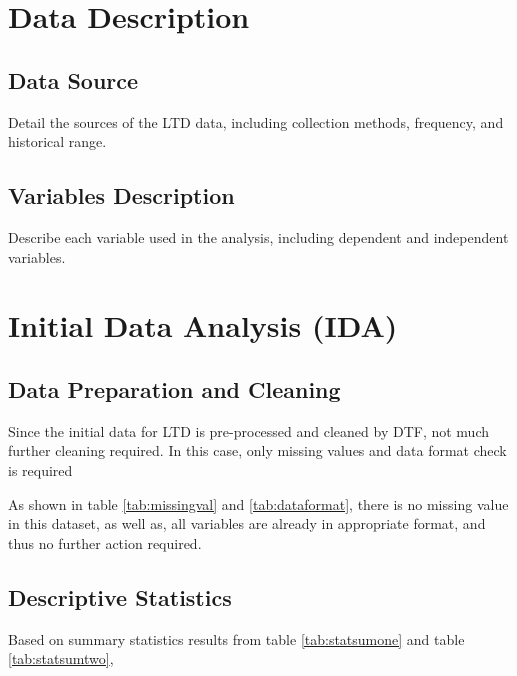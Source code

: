 \documentclass[11pt,a4paper,]{article}
\begin{document}
\section{Data Description}\label{data-description}

\subsection{Data Source}\label{data-source}

Detail the sources of the LTD data, including collection methods, frequency, and historical range.

\subsection{Variables Description}\label{variables-description}

Describe each variable used in the analysis, including dependent and independent variables.

\section{Initial Data Analysis (IDA)}\label{initial-data-analysis-ida}

\subsection{Data Preparation and Cleaning}\label{data-preparation-and-cleaning}

Since the initial data for LTD is pre-processed and cleaned by DTF, not much further cleaning required. In this case, only missing values and data format check is required

As shown in table \ref{tab:missingval} and \ref{tab:dataformat}, there is no missing value in this dataset, as well as, all variables are already in appropriate format, and thus no further action required.

\subsection{Descriptive Statistics}\label{descriptive-statistics}

Based on summary statistics results from table \ref{tab:statsumone} and table \ref{tab:statsumtwo},
\end{document}
